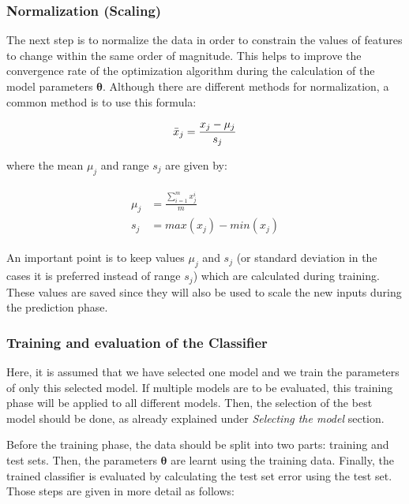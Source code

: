  \subsubsection{Normalization (Scaling)}

The next step is to normalize the data in order to constrain the values of features to change within the same order of magnitude. 
This helps to improve the convergence rate of the optimization algorithm during the calculation of the model parameters $\bm{\theta}$.  
Although there are different methods for normalization, a common method is to use this formula:

\begin{equation}{\label{eqn:scalingFeatures}}
\bar{x}_j = \frac{x_j - \mu_j}{s_j} 
\end{equation} 

where the mean $\mu_j$ and range $s_j$ are given by:

\begin{align}
\label{eqn:meandAndRange}
\begin{split}
\mu_j & = \frac{\sum\limits_{i=1}^m {x_j^i} }{m}
\\
s_j & = max(x_j) - min(x_j)
\end{split}
\end{align}

An important point is to keep values $\mu_j$ and $s_j$ (or standard deviation in the cases it is preferred instead of range $s_j$) which are calculated during training. 
These values are saved since they will also be used to scale the new inputs during the prediction phase.


\subsubsection{Training and evaluation of the Classifier}  %

Here, it is assumed that we have selected one model and we train the parameters of only this selected model. 
If multiple models are to be evaluated, this training phase will be applied to all different models. 
Then, the selection of the best model should be done, as already explained under \emph{Selecting the model} section.  

Before the training phase, the data should be split into two parts: training and test sets.
Then, the parameters $\bm{\theta}$ are learnt using the training data. 
Finally, the trained classifier is evaluated by calculating the test set error using the test set.
Those steps are given in more detail as follows:
 
